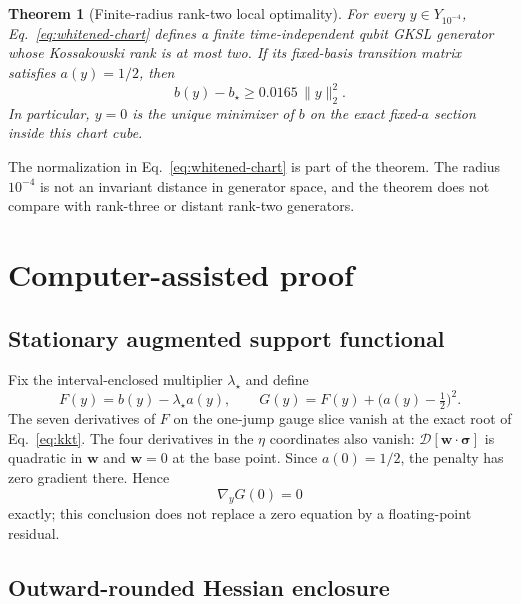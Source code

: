 \documentclass[11pt,a4paper]{article}
\newtheorem{theorem}{Theorem}
\newcommand{\cD}{\mathcal{D}}
\begin{document}
\begin{theorem}[Finite-radius rank-two local optimality]
\label{thm:main}
For every $y\in Y_{10^{-4}}$, Eq.~\eqref{eq:whitened-chart} defines a finite
time-independent qubit GKSL generator whose Kossakowski rank is at most two.
If its fixed-basis transition matrix satisfies $a(y)=1/2$, then
\begin{equation}
 b(y)-b_\star\geq0.0165\,\lVert y\rVert_2^2.
 \label{eq:main-bound}
\end{equation}
In particular, $y=0$ is the unique minimizer of $b$ on the exact fixed-$a$
section inside this chart cube.
\end{theorem}

The normalization in Eq.~\eqref{eq:whitened-chart} is part of the theorem.
The radius $10^{-4}$ is not an invariant distance in generator space, and
the theorem does not compare with rank-three or distant rank-two generators.

\section{Computer-assisted proof}
\label{sec:proof}

\subsection{Stationary augmented support functional}

Fix the interval-enclosed multiplier $\lambda_\star$ and define
\begin{equation}
 F(y)=b(y)-\lambda_\star a(y),\qquad
 G(y)=F(y)+\bigl(a(y)-\tfrac12\bigr)^2.
 \label{eq:G}
\end{equation}
The seven derivatives of $F$ on the one-jump gauge slice vanish at the exact
root of Eq.~\eqref{eq:kkt}.  The four derivatives in the $\eta$ coordinates
also vanish: $\cD[\bm w\cdot\bm\sigma]$ is quadratic in $\bm w$ and
$\bm w=0$ at the base point.  Since $a(0)=1/2$, the penalty has zero gradient
there.  Hence
\begin{equation}
 \nabla_yG(0)=0
 \label{eq:stationary}
\end{equation}
exactly; this conclusion does not replace a zero equation by a floating-point
residual.

\subsection{Outward-rounded Hessian enclosure}
\end{document}
